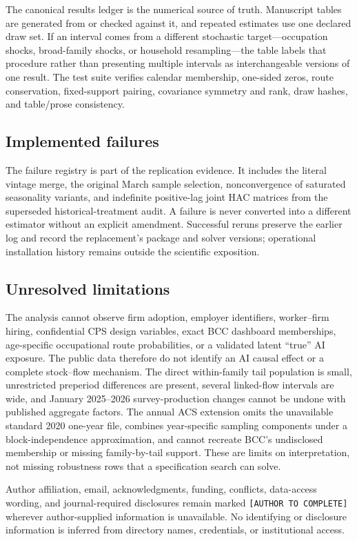The canonical results ledger is the numerical source of truth.  Manuscript tables are generated from or checked against it, and repeated estimates use one declared draw set.  If an interval comes from a different stochastic target---occupation shocks, broad-family shocks, or household resampling---the table labels that procedure rather than presenting multiple intervals as interchangeable versions of one result.  The test suite verifies calendar membership, one-sided zeros, route conservation, fixed-support pairing, covariance symmetry and rank, draw hashes, and table/prose consistency.

\subsection{Implemented failures}

The failure registry is part of the replication evidence.  It includes the literal vintage merge, the original March sample selection, nonconvergence of saturated seasonality variants, and indefinite positive-lag joint HAC matrices from the superseded historical-treatment audit.  A failure is never converted into a different estimator without an explicit amendment.  Successful reruns preserve the earlier log and record the replacement's package and solver versions; operational installation history remains outside the scientific exposition.

\subsection{Unresolved limitations}

The analysis cannot observe firm adoption, employer identifiers, worker--firm hiring, confidential CPS design variables, exact BCC dashboard memberships, age-specific occupational route probabilities, or a validated latent ``true'' AI exposure.  The public data therefore do not identify an AI causal effect or a complete stock--flow mechanism.  The direct within-family tail population is small, unrestricted preperiod differences are present, several linked-flow intervals are wide, and January 2025--2026 survey-production changes cannot be undone with published aggregate factors.  The annual ACS extension omits the unavailable standard 2020 one-year file, combines year-specific sampling components under a block-independence approximation, and cannot recreate BCC's undisclosed membership or missing family-by-tail support.  These are limits on interpretation, not missing robustness rows that a specification search can solve.

Author affiliation, email, acknowledgments, funding, conflicts, data-access wording, and journal-required disclosures remain marked \texttt{[AUTHOR TO COMPLETE]} wherever author-supplied information is unavailable.  No identifying or disclosure information is inferred from directory names, credentials, or institutional access.
